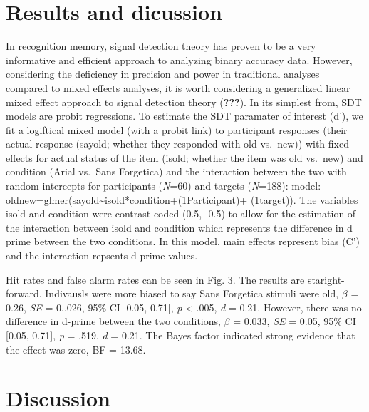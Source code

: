 \documentclass[english,pdf]{apa6}
\begin{document}
\hypertarget{results-and-dicussion}{%
\section{Results and dicussion}\label{results-and-dicussion}}

In recognition memory, signal detection theory has proven to be a very informative and efficient approach to analyzing binary accuracy data. However, considering the deficiency in precision and power in traditional analyses compared to mixed effects analyses, it is worth considering a generalized linear mixed effect approach to signal detection theory ({\textbf{???}}). In its simplest from, SDT models are probit regressions. To estimate the SDT paramater of interest (d'), we fit a logiftical mixed model (with a probit link) to participant responses (their actual response (sayold; whether they responded with old vs.~new)) with fixed effects for actual status of the item (isold; whether the item was old vs.~new) and condition (Arial vs.~Sans Forgetica) and the interaction between the two with random intercepts for participants (\emph{N}=60) and targets (\emph{N}=188): model: oldnew=glmer(sayold\textasciitilde{}isold*condition+(1\textbar{}Participant)+ (1\textbar{}target)). The variables isold and condition were contrast coded (0.5, -0.5) to allow for the estimation of the interaction between isold and condition which represents the difference in d prime between the two conditions. In this model, main effects represent bias (C') and the interaction repsents d-prime values.

Hit rates and false alarm rates can be seen in Fig. 3. The results are staright-forward. Indivausls were more biased to say Sans Forgetica stimuli were old, \(\beta\) = 0.26, \emph{SE} = 0..026, 95\% CI {[}0.05, 0.71{]}, \emph{p} \textless{} .005, \emph{d} = 0.21. However, there was no difference in d-prime between the two conditions, \(\beta\) = 0.033, \emph{SE} = 0.05, 95\% CI {[}0.05, 0.71{]}, \emph{p} = .519, \emph{d} = 0.21. The Bayes factor indicated strong evidence that the effect was zero, BF = 13.68.

\hypertarget{discussion}{%
\section{Discussion}\label{discussion}}
\end{document}
